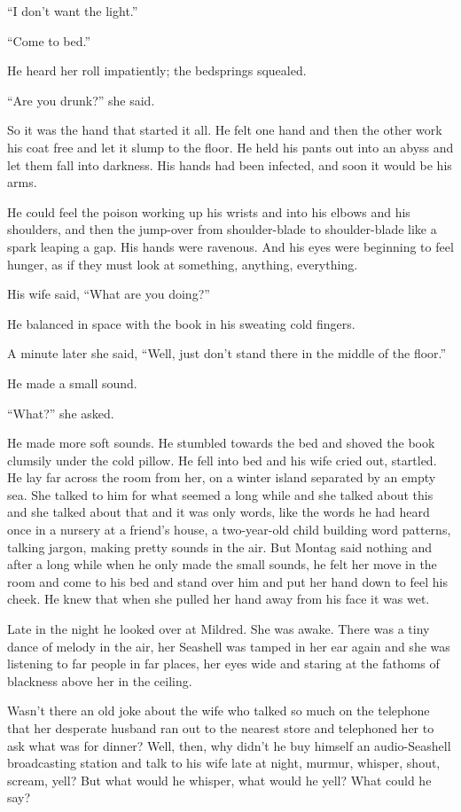\documentclass[11pt,openany]{book}
\begin{document}
``I don't want the light.''

``Come to bed.''

He heard her roll impatiently; the bedsprings squealed.

``Are you drunk?'' she said.

So it was the hand that started it all. He felt one hand and then the other work his coat free and let it slump to the floor. He held his pants out into an abyss and let them fall into darkness. His hands had been infected, and soon it would be his arms.

He could feel the poison working up his wrists and into his elbows and his shoulders, and then the jump-over from shoulder-blade to shoulder-blade like a spark leaping a gap. His hands were ravenous. And his eyes were beginning to feel hunger, as if they must look at something, anything, everything.

His wife said, ``What are you doing?''

He balanced in space with the book in his sweating cold fingers.

A minute later she said, ``Well, just don't stand there in the middle of the floor.''

He made a small sound.

``What?'' she asked.

He made more soft sounds. He stumbled towards the bed and shoved the book clumsily under the cold pillow. He fell into bed and his wife cried out, startled. He lay far across the room from her, on a winter island separated by an empty sea. She talked to him for what seemed a long while and she talked about this and she talked about that and it was only words, like the words he had heard once in a nursery at a friend's house, a two-year-old child building word patterns, talking jargon, making pretty sounds in the air. But Montag said nothing and after a long while when he only made the small sounds, he felt her move in the room and come to his bed and stand over him and put her hand down to feel his cheek. He knew that when she pulled her hand away from his face it was wet.

Late in the night he looked over at Mildred. She was awake. There was a tiny dance of melody in the air, her Seashell was tamped in her ear again and she was listening to far people in far places, her eyes wide and staring at the fathoms of blackness above her in the ceiling.

Wasn't there an old joke about the wife who talked so much on the telephone that her desperate husband ran out to the nearest store and telephoned her to ask what was for dinner? Well, then, why didn't he buy himself an audio-Seashell broadcasting station and talk to his wife late at night, murmur, whisper, shout, scream, yell? But what would he whisper, what would he yell? What could he say?
\end{document}
